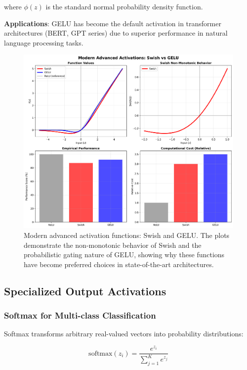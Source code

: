 \documentclass[11pt,a4paper]{report}
\begin{document}
where $\phi(z)$ is the standard normal probability density function.

\textbf{Applications}: GELU has become the default activation in transformer architectures (BERT, GPT series) due to superior performance in natural language processing tasks.

\begin{figure}[H]
\centering
\includegraphics[width=\textwidth]{activation_modern_advanced.png}
\caption{Modern advanced activation functions: Swish and GELU. The plots demonstrate the non-monotonic behavior of Swish and the probabilistic gating nature of GELU, showing why these functions have become preferred choices in state-of-the-art architectures.}
\label{fig:activation_modern}
\end{figure}

\subsection{Specialized Output Activations}

\subsubsection{Softmax for Multi-class Classification}

Softmax transforms arbitrary real-valued vectors into probability distributions:

\begin{equation}
\text{softmax}(z_i) = \frac{e^{z_i}}{\sum_{j=1}^K e^{z_j}}
\end{equation}
\end{document}
